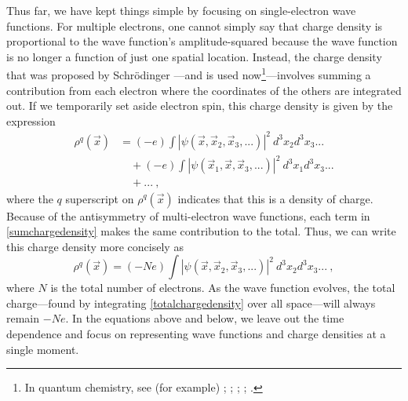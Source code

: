 \documentclass[12pt,onecolumn,secnumarabic,amsmath,amssymb,balancelastpage,nofootinbib]{article}
\begin{document}
Thus far, we have kept things simple by focusing on single-electron wave functions.  For multiple electrons, one cannot simply say that charge density is proportional to the wave function's amplitude-squared because the wave function is no longer a function of just one spatial location.  Instead, the charge density that was proposed by Schr\"{o}dinger \cite{schrodinger1926pt4, schrodingerletter}---and is used now\footnote{In quantum chemistry, see (for example) \cite[sec.\ 3.8.3]{szaboQC}; \cite[sec.\ 1.3]{bader1990}; \cite{bader2010}; \cite{matta2002}; \cite[pg.\ 403]{levineQC}.}---involves summing a contribution from each electron where the coordinates of the others are integrated out.  If we temporarily set aside electron spin, this charge density is given by the expression
\begin{align}
\rho^q(\vec{x})&=(-e) \int{|\psi(\vec{x},\vec{x}_2, \vec{x}_3, ...)|^2 \ d^3 x_2 d^3 x_3 ...}
\nonumber
\\
&\quad + (-e) \int{|\psi(\vec{x}_1,\vec{x}, \vec{x}_3, ...)|^2 \ d^3 x_1 d^3 x_3 ...}
\nonumber
\\
&\quad + ...
\ ,
\label{sumchargedensity}
\end{align}
where the $q$ superscript on $\rho^q(\vec{x})$ indicates that this is a density of charge.  Because of the antisymmetry of multi-electron wave functions, each term in \eqref{sumchargedensity} makes the same contribution to the total.  Thus, we can write this charge density more concisely as
\begin{equation}
\rho^q(\vec{x})=(-N e) \int{|\psi(\vec{x},\vec{x}_2, \vec{x}_3, ...)|^2 \ d^3 x_2 d^3 x_3 ...}
\ ,
\label{totalchargedensity}
\end{equation}
where $N$ is the total number of electrons.  As the wave function evolves, the total charge---found by integrating \eqref{totalchargedensity} over all space---will always remain $-Ne$.  In the equations above and below, we leave out the time dependence and focus on representing wave functions and charge densities at a single moment.
\end{document}

